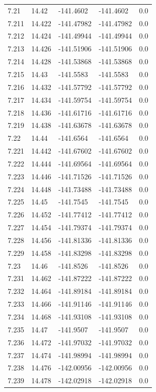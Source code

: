 \begin{tabular}{lllll}
7.21 & 14.42 & -141.4602 & -141.4602 & 0.0 \\
7.211 & 14.422 & -141.47982 & -141.47982 & 0.0 \\
7.212 & 14.424 & -141.49944 & -141.49944 & 0.0 \\
7.213 & 14.426 & -141.51906 & -141.51906 & 0.0 \\
7.214 & 14.428 & -141.53868 & -141.53868 & 0.0 \\
7.215 & 14.43 & -141.5583 & -141.5583 & 0.0 \\
7.216 & 14.432 & -141.57792 & -141.57792 & 0.0 \\
7.217 & 14.434 & -141.59754 & -141.59754 & 0.0 \\
7.218 & 14.436 & -141.61716 & -141.61716 & 0.0 \\
7.219 & 14.438 & -141.63678 & -141.63678 & 0.0 \\
7.22 & 14.44 & -141.6564 & -141.6564 & 0.0 \\
7.221 & 14.442 & -141.67602 & -141.67602 & 0.0 \\
7.222 & 14.444 & -141.69564 & -141.69564 & 0.0 \\
7.223 & 14.446 & -141.71526 & -141.71526 & 0.0 \\
7.224 & 14.448 & -141.73488 & -141.73488 & 0.0 \\
7.225 & 14.45 & -141.7545 & -141.7545 & 0.0 \\
7.226 & 14.452 & -141.77412 & -141.77412 & 0.0 \\
7.227 & 14.454 & -141.79374 & -141.79374 & 0.0 \\
7.228 & 14.456 & -141.81336 & -141.81336 & 0.0 \\
7.229 & 14.458 & -141.83298 & -141.83298 & 0.0 \\
7.23 & 14.46 & -141.8526 & -141.8526 & 0.0 \\
7.231 & 14.462 & -141.87222 & -141.87222 & 0.0 \\
7.232 & 14.464 & -141.89184 & -141.89184 & 0.0 \\
7.233 & 14.466 & -141.91146 & -141.91146 & 0.0 \\
7.234 & 14.468 & -141.93108 & -141.93108 & 0.0 \\
7.235 & 14.47 & -141.9507 & -141.9507 & 0.0 \\
7.236 & 14.472 & -141.97032 & -141.97032 & 0.0 \\
7.237 & 14.474 & -141.98994 & -141.98994 & 0.0 \\
7.238 & 14.476 & -142.00956 & -142.00956 & 0.0 \\
7.239 & 14.478 & -142.02918 & -142.02918 & 0.0 \\

\end{tabular}
